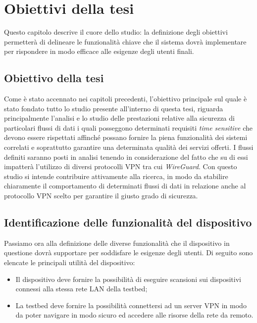\chapter{Obiettivi della tesi} %
%

\begin{citazione}
Questo capitolo descrive il cuore dello studio: la definizione degli obiettivi permetterà di delineare le funzionalità chiave che il sistema dovrà implementare per rispondere in modo efficace alle esigenze degli utenti finali.
\end{citazione}
\newpage
\section{Obiettivo della tesi}
Come è stato accennato nei capitoli precedenti, l'obiettivo principale sul quale è stato fondato tutto lo studio presente all'interno di questa tesi, riguarda principalmente l'analisi e lo studio delle prestazioni relative alla sicurezza di particolari flussi di dati i quali posseggono determinati requisiti \emph{time sensitive} che devono essere rispettati affinché possano fornire la piena funzionalità dei sistemi correlati e soprattutto garantire una determinata qualità dei servizi offerti. I flussi definiti saranno posti in analisi tenendo in considerazione del fatto che su di essi impatterà l'utilizzo di diversi protocolli VPN tra cui \emph{WireGuard}. Con questo studio si intende contribuire attivamente alla ricerca, in modo da stabilire chiaramente il comportamento di determinati flussi di dati in relazione anche al protocollo VPN scelto per garantire il giusto grado di sicurezza. 

\section{Identificazione delle funzionalità del dispositivo}
Passiamo ora alla definizione delle diverse funzionalità che il dispositivo in questione dovrà supportare per soddisfare le esigenze degli utenti. Di seguito sono elencate le principali utilità del dispositivo:
\begin{itemize}
    \item Il dispositivo deve fornire la possibilità di eseguire scansioni sui dispositivi connessi alla stessa rete LAN della testbed;
    \item La testbed deve fornire la possibilità connettersi ad un server VPN in modo da poter navigare in modo sicuro ed accedere alle risorse della rete da remoto.
\end{itemize}

